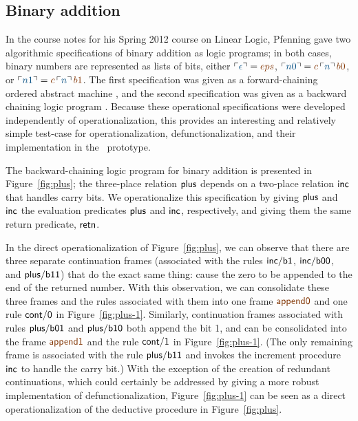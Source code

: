 \subsection{Binary addition}

In the course notes for his Spring 2012 course on Linear Logic,
Pfenning gave two algorithmic specifications of binary addition as logic
programs; in both cases, binary numbers are represented as lists of
bits, either $\interp{\epsilon} = \lf{eps}$, $\interp{n0} =
\lf{c}\,\interp{n}\,\lf{b0}$, or $\interp{n1} =
\lf{c}\,\interp{n}\,\lf{b1}$.  The first specification was given as a
forward-chaining ordered abstract machine \cite{pfenning12ordered},
and the second specification was given as a backward chaining logic
program \cite{pfenning12backward}.  Because these operational
specifications were developed independently of operationalization,
this provides an interesting and relatively simple test-case for
operationalization, defunctionalization, and their implementation in
the \sls~prototype.

The backward-chaining logic program for binary addition is presented
in Figure~\ref{fig:plus}; the three-place relation ${\sf plus}$
depends on a two-place relation ${\sf inc}$ that handles carry bits.
We operationalize this specification by giving ${\sf plus}$ and ${\sf
  inc}$ the evaluation predicates ${\sf plus}$ and ${\sf inc}$,
respectively, and giving them the same return predicate, ${\sf retn}$.

In the direct operationalization of Figure~\ref{fig:plus}, we can
observe that there are three separate continuation frames (associated
with the rules ${\sf inc/b1}$, ${\sf inc/b00}$, and ${\sf plus/b11}$)
that do the exact same thing: cause the zero to be appended to the end
of the returned number. With this observation, we can consolidate
these three frames and the rules associated with them into one frame
$\lf{\sf append0}$ and one rule ${\sf cont/0}$ in
Figure~\ref{fig:plus-1}. Similarly, continuation frames associated
with rules ${\sf plus/b01}$ and ${\sf plus/b10}$ both append the bit
1, and can be consolidated into the frame $\lf{\sf append1}$ and the rule
${\sf cont/1}$ in Figure~\ref{fig:plus-1}. (The only remaining frame
is associated with the rule ${\sf plus/b11}$ and invokes the increment
procedure ${\sf inc}$ to handle the carry bit.) With the exception of
the creation of redundant continuations, which could certainly be
addressed by giving a more robust implementation of
defunctionalization, Figure~\ref{fig:plus-1} can be seen as a direct
operationalization of the deductive procedure in
Figure~\ref{fig:plus}.

